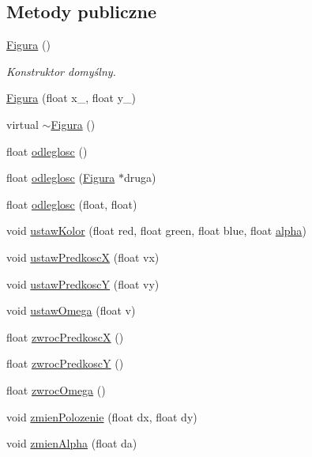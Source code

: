 \subsection*{Metody publiczne}
\begin{DoxyCompactItemize}
\item 
\hyperlink{classFigura_a6977c7f0438c11b985a9a74c208b51c8}{Figura} ()
\begin{DoxyCompactList}\small\item\em Konstruktor domyślny. \end{DoxyCompactList}\item 
\hyperlink{classFigura_a9597f3d418eda29436184422e6347518}{Figura} (float x\-\_\-, float y\-\_\-)
\item 
virtual \hyperlink{classFigura_a6130eb548893c36efcb7933e2da6821e}{$\sim$\-Figura} ()
\item 
float \hyperlink{classFigura_a8221a03216b76b37e11a7e258b2e6b1f}{odleglosc} ()
\item 
float \hyperlink{classFigura_a351dd41d348f9a2adaed7802c12722df}{odleglosc} (\hyperlink{classFigura}{Figura} $\ast$druga)
\item 
float \hyperlink{classFigura_a1b60d6f4763b92efa9cb4307aecea892}{odleglosc} (float, float)
\item 
void \hyperlink{classFigura_a08bbbedf4e27f5f17ba897ea6b1bf7a5}{ustaw\-Kolor} (float red, float green, float blue, float \hyperlink{classFigura_a601361fbb05bc4dc3b9cab1a868b2910}{alpha})
\item 
void \hyperlink{classFigura_a6e7a5f23810da2aa73f2ad28f8918d31}{ustaw\-Predkosc\-X} (float vx)
\item 
void \hyperlink{classFigura_a22ffec44b60184584f94e1fcd95bf5b5}{ustaw\-Predkosc\-Y} (float vy)
\item 
void \hyperlink{classFigura_a93bd750b3c4311f584fe2e1d899b470a}{ustaw\-Omega} (float v)
\item 
float \hyperlink{classFigura_a33b849c7f3a12e260ae6294f1120b4bd}{zwroc\-Predkosc\-X} ()
\item 
float \hyperlink{classFigura_a6d40d8f173b099d9e76d7a7ccc73a0cb}{zwroc\-Predkosc\-Y} ()
\item 
float \hyperlink{classFigura_a94da9ef8eb433270570abd5074dbd3fa}{zwroc\-Omega} ()
\item 
void \hyperlink{classFigura_a8eaf7fc68e05ce5a602ae741759e36e4}{zmien\-Polozenie} (float dx, float dy)
\item 
void \hyperlink{classFigura_ab017b5da886407a1a809f15ed9ab32f4}{zmien\-Alpha} (float da)

\end{DoxyCompactItemize}

